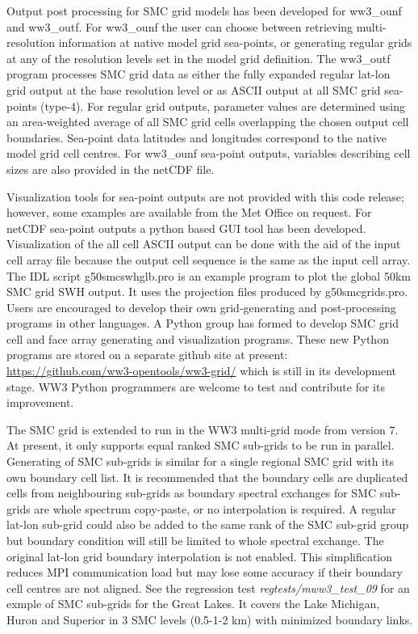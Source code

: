 Output post processing for SMC grid models has been developed for
ww3\_ounf and ww3\_outf. For ww3\_ounf the user can choose between
retrieving multi-resolution information at native model grid sea-points,
or generating regular grids at any of the resolution levels set in
the model grid definition. The ww3\_outf program processes SMC grid data
as either the fully expanded regular lat-lon grid output at the base
resolution level or as ASCII output at all SMC grid sea-points (type-4).
For regular grid outputs, parameter values are determined
using an area-weighted average of all SMC grid cells overlapping the chosen
output cell boundaries. Sea-point data latitudes and longitudes 
correspond to the native model grid cell centres. For ww3\_ounf
sea-point outputs, variables describing cell sizes are also provided
in the netCDF file.

Visualization tools for sea-point outputs are not provided with this
code release; however, some examples are available from the Met Office
on request. For netCDF sea-point outputs a python based GUI tool has
been developed. Visualization of the all cell ASCII output can be done
with the aid of the input cell array file because the output cell 
sequence is the same as the input cell array. The IDL script 
g50smcswhglb.pro is an example program to plot the global 50km SMC grid
SWH output. It uses the projection files produced by g50smcgrids.pro. 
Users are encouraged to develop their own grid-generating and 
post-processing programs in other languages.  A Python group has formed to
develop SMC grid cell and face array generating and visualization programs.
These new Python programs are stored on a separate github site at present:  
\url{https://github.com/ww3-opentools/ww3-grid/}
which is still in its development stage.  WW3 Python programmers are welcome to
test and contribute for its improvement.  

The SMC grid is extended to run in the WW3 multi-grid mode from version 7.  At 
present, it only supports equal ranked SMC sub-grids to be run in parallel.
Generating of SMC sub-grids is similar for a single regional SMC grid with its
own boundary cell list.  It is recommended that the boundary cells are
duplicated cells from neighbouring sub-grids as boundary spectral exchanges for
SMC sub-grids are whole spectrum copy-paste, or no interpolation is required.
A regular lat-lon sub-grid could also be added to the same rank of the SMC 
sub-grid group but boundary condition will still be limited to whole spectral
exchange.  The original lat-lon grid boundary interpolation is not enabled. 
This simplification reduces MPI communication load but may lose some accuracy
if their boundary cell centres are not aligned.  See the regression test    
\emph{regtests/mww3_test\_09} for an exmple of SMC sub-grids for the Great
Lakes.  It covers the Lake Michigan, Huron and Superior in 3 SMC levels 
(0.5-1-2 km) with minimized boundary links.
  
